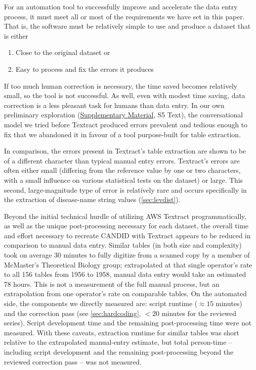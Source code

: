 \documentclass[12pt]{article}
\begin{document}
For an automation tool to successfully improve and accelerate the data entry process, it must meet all or most of the requirements we have set in this paper. That is, the software must be relatively simple to use and produce a dataset that is either 
\begin{enumerate}
    \item Close to the original dataset or
    \item Easy to process and fix the errors it produces
\end{enumerate}
If too much human correction is necessary, the time saved becomes relatively small, so the tool is not successful. As well, even with modest time saving, data correction is a less pleasant task for humans than data entry. In our own preliminary exploration (\hyperref[sec:supp]{Supplementary Material}, S5 Text), the conversational model we tried before Textract produced errors prevalent and tedious enough to fix that we abandoned it in favour of a tool purpose-built for table extraction.

In comparison, the errors present in Textract's table extraction are shown to be of a different character than typical manual entry errors. Textract's errors are often either small (differing from the reference value by one or two characters, with a small influence on various statistical tests on the dataset) or large. This second, large-magnitude type of error is relatively rare and occurs specifically in the extraction of disease-name string values (\cref{sec:levdist}).

Beyond the initial technical hurdle of utilizing AWS Textract programmatically, as well as the unique post-processing necessary for each dataset, the overall time and effort necessary to recreate CANDID with Textract appears to be reduced in comparison to manual data entry. Similar tables (in both size and complexity) took on average 30 minutes to fully digitize from a scanned copy by a member of McMaster's Theoretical Biology group; extrapolated at that single operator's rate to all 156 tables from 1956 to 1958, manual data entry would take an estimated 78 hours. This is not a measurement of the full manual process, but an extrapolation from one operator's rate on comparable tables. On the automated side, the components we directly measured are: script runtime ($\approx15$ minutes) and the correction pass (see \cref{sec:hardcoding}, $<20$ minutes for the reviewed series). Script development time and the remaining post-processing time were not measured. With these caveats, extraction runtime for similar tables was short relative to the extrapolated manual-entry estimate, but total person-time -- including script development and the remaining post-processing beyond the reviewed correction pass -- was not measured.
\end{document}
